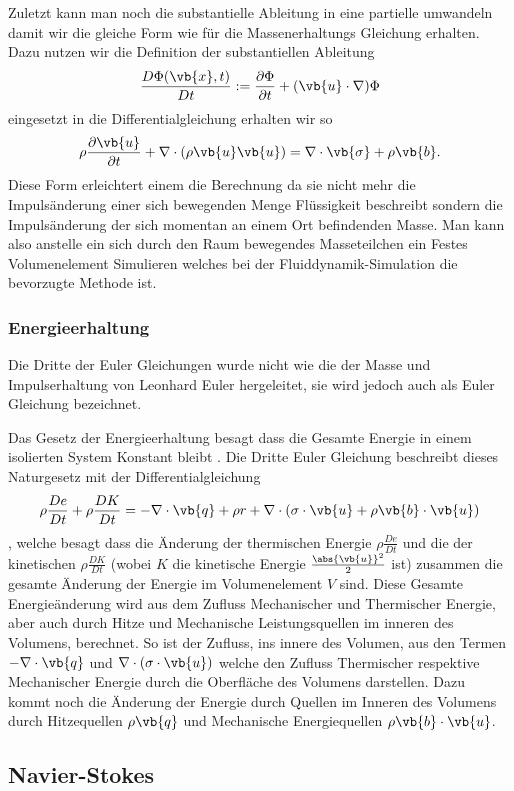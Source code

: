 Zuletzt kann man noch die substantielle Ableitung in eine partielle umwandeln damit wir die gleiche Form wie für die Massenerhaltungs Gleichung erhalten.
Dazu nutzen wir die Definition der substantiellen Ableitung
\[
\frac{D\Phi(\vb{x},t)}{Dt}
:=
\frac{\partial \Phi}{\partial t}+(\vb{u}\cdot \nabla)\Phi
\] 
eingesetzt in die Differentialgleichung erhalten wir so 
\[ \rho\frac{\partial\vb{u}}{\partial t} + \nabla \cdot(\rho\vb{u}\vb{u})
= 
\nabla \cdot \vb{\sigma} +\rho \vb{b}.
\]
Diese Form erleichtert einem die Berechnung da sie nicht mehr die Impulsänderung einer sich bewegenden Menge Flüssigkeit beschreibt sondern die Impulsänderung der sich momentan an einem Ort befindenden Masse. Man kann also anstelle ein sich durch den Raum bewegendes Masseteilchen ein Festes Volumenelement Simulieren welches bei der Fluiddynamik-Simulation die bevorzugte Methode ist.

\subsubsection{Energieerhaltung}
Die Dritte der Euler Gleichungen wurde nicht wie die der Masse und Impulserhaltung von Leonhard Euler hergeleitet, sie wird jedoch auch als  Euler Gleichung bezeichnet.

Das Gesetz der Energieerhaltung besagt dass die Gesamte Energie in einem isolierten System Konstant bleibt .
Die Dritte Euler Gleichung beschreibt dieses Naturgesetz mit der Differentialgleichung 
\[\rho \frac{De}{Dt}+  \rho \frac{DK}{Dt}
=
- \nabla \cdot \vb{q} + \rho r + \nabla \cdot (\sigma \cdot \vb{u} + \rho \vb{b} \cdot \vb{u} )
\]
, welche besagt dass die Änderung der thermischen Energie $\rho \frac{De}{Dt}$ und die der kinetischen $\rho \frac{DK}{Dt}$ (wobei $K$ die kinetische Energie $\frac{\abs{\vb{u}}^{2}}{2}$ ist) zusammen die gesamte Änderung der Energie im Volumenelement $V$ sind.
Diese Gesamte Energieänderung wird aus dem Zufluss Mechanischer und Thermischer Energie, aber auch durch Hitze und Mechanische Leistungsquellen im inneren des Volumens, berechnet.
So ist der Zufluss, ins innere des Volumen, aus den Termen $- \nabla \cdot \vb{q}$ und $\nabla \cdot (\sigma \cdot \vb{u})$ welche den Zufluss Thermischer respektive Mechanischer Energie durch die Oberfläche des Volumens darstellen.
Dazu kommt noch die Änderung der Energie durch Quellen im Inneren des Volumens durch Hitzequellen $\rho \vb{q}$ und Mechanische Energiequellen $\rho \vb{b} \cdot \vb{u}$.




\subsection{Navier-Stokes}
